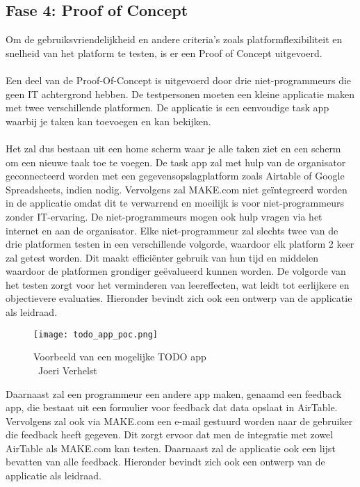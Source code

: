 \subsection*{Fase 4: Proof of Concept}%
\label{sec:proof-of-concept}
Om de gebruiksvriendelijkheid en andere criteria's zoals platformflexibiliteit en snelheid van het platform te testen, is er een Proof of Concept uitgevoerd. 
\\
\\
Een deel van de Proof-Of-Concept is uitgevoerd door drie niet-programmeurs die geen IT achtergrond hebben. De testpersonen moeten
een kleine applicatie maken met twee verschillende platformen. De applicatie is een eenvoudige task app waarbij je taken kan toevoegen en kan bekijken.
\\
\\
Het zal dus bestaan uit een home scherm waar je alle taken ziet en een scherm om een nieuwe taak toe te voegen. De task app zal met hulp van de organisator geconnecteerd worden met een gegevensopslagplatform zoals Airtable of Google Spreadsheets, indien nodig. 
Vervolgens zal MAKE.com niet geïntegreerd worden in de applicatie omdat dit te verwarrend en moeilijk is voor niet-programmeurs zonder IT-ervaring.
De niet-programmeurs mogen ook hulp vragen via het internet en aan de organisator.
Elke niet-programmeur zal slechts twee van de drie platformen testen in een verschillende volgorde, waardoor elk platform 2 keer zal getest worden. Dit maakt efficiënter gebruik van hun tijd en middelen waardoor de platformen grondiger geëvalueerd kunnen worden. De volgorde van het testen zorgt voor het verminderen van leereffecten, wat leidt tot eerlijkere en objectievere evaluaties.
Hieronder bevindt zich ook een ontwerp van de applicatie als leidraad.
\\
\begin{figure}[H]
    \centering
    \texttt{[image: todo\_app\_poc.png]}
    \caption[Voorbeeld van een mogelijke TODO app]{Voorbeeld van een mogelijke TODO app\\\textcopyright\ Joeri Verhelst}
    \label{fig:todo_app}
\end{figure}

Daarnaast zal een programmeur een andere app maken, genaamd een feedback app, die bestaat uit een formulier voor feedback dat data opslaat in AirTable.
Vervolgens zal ook via MAKE.com een e-mail gestuurd worden naar de gebruiker die feedback heeft gegeven.
Dit zorgt ervoor dat men de integratie met zowel AirTable als MAKE.com kan testen. Daarnaast zal de applicatie ook een lijst bevatten van alle feedback.
Hieronder bevindt zich ook een ontwerp van de applicatie als leidraad.

